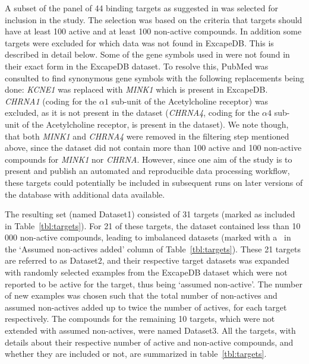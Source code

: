\documentclass[utf8]{frontiersSCNS} %
\begin{document}
A subset of the panel of 44 binding targets as suggested in \cite{Bowes2012}
was selected for inclusion in the study. The selection was based on the
criteria that targets should have at least 100 active and at least 100
non-active compounds.  In addition some targets were excluded for which data
was not found in ExcapeDB. This is described in detail below.
%
Some of the gene symbols used in \cite{Bowes2012} were not found in their exact
form in the ExcapeDB dataset. To resolve this, PubMed was consulted to find
synonymous gene symbols with the following replacements being done:
%
\textit{KCNE1} was replaced with \textit{MINK1} which is present in ExcapeDB.
\textit{CHRNA1} (coding for the $\alpha1$ sub-unit of the Acetylcholine
receptor) was excluded, as it is not present in the dataset (\textit{CHRNA4},
coding for the $\alpha4$ sub-unit of the Acetylcholine receptor, is present in
the dataset). We note though, that both \textit{MINK1} and \textit{CHRNA4} were removed
in the filtering step mentioned above, since the dataset did not contain more
than 100 active and 100 non-active compounds for \textit{MINK1} nor
\textit{CHRNA}.  However, since one aim of the study is to present and publish
an automated and reproducible data processing workflow, these targets could
potentially be included in subsequent runs on later versions of the database
with additional data available.

The resulting set (named Dataset1) consisted of 31 targets (marked as included in
Table~\ref{tbl:targets}). For 21 of these targets, the dataset contained less
than 10\,000 non-active compounds, leading to imbalanced datasets (marked with
a \checkmark\ in the `Assumed non-actives added' column of Table~\ref{tbl:targets}).
These 21 targets are referred to as Dataset2, and their respective target datasets was expanded with randomly
selected examples from the ExcapeDB dataset which were not reported to be active for
the target, thus being `assumed non-active'. The number of new examples was chosen such that the total
number of non-actives and assumed non-actives added up to twice the number of
actives, for each target respectively. The compounds for the remaining 10 targets, which were not extended with
assumed non-actives, were named Dataset3.
%
All the targets, with details about their respective number of active and
non-active compounds, and whether they are included or not, are summarized in
table~\ref{tbl:targets}.
\end{document}
